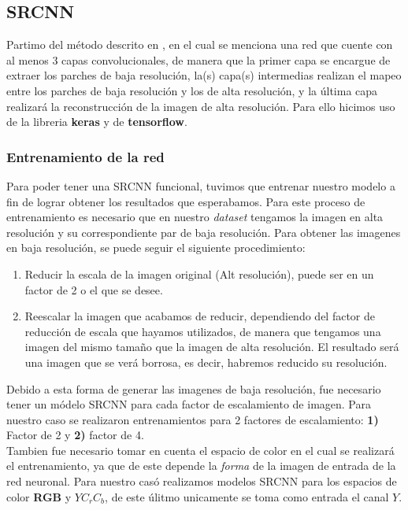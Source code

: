 \subsection{SRCNN}
Partimo del método descrito en \cite{SRCNN}, en el cual se menciona una red que cuente con al menos 3 capas convolucionales, de
manera que la primer capa se encargue de extraer los parches de baja resolución, la(s) capa(s) intermedias realizan el mapeo entre
los parches de baja resolución y los de alta resolución, y la última capa realizará la reconstrucción de la imagen de alta
resolución. Para ello hicimos uso de la libreria \textbf{keras} y de \textbf{tensorflow}.\\
\subsubsection{Entrenamiento de la red}
Para poder tener una SRCNN funcional, tuvimos que entrenar nuestro modelo a fin de lograr obtener los resultados que esperabamos.
Para este proceso de entrenamiento es necesario que en nuestro \emph{dataset} tengamos la imagen en alta resolución y su
correspondiente par de baja resolución. Para obtener las imagenes en baja resolución, se puede seguir el siguiente procedimiento:
\begin{enumerate}
    \item Reducir la escala de la imagen original (Alt resolución), puede ser en un factor de 2 o el que se desee.
    \item Reescalar la imagen que acabamos de reducir, dependiendo del factor de reducción de escala que hayamos utilizados, de
    manera que tengamos una imagen del mismo tamaño que la imagen de alta resolución. El resultado será una imagen que se verá
    borrosa, es decir, habremos reducido su resolución.
\end{enumerate}
Debido a esta forma de generar las imagenes de baja resolución, fue necesario tener un módelo SRCNN para cada factor de escalamiento
de imagen. Para nuestro caso se realizaron entrenamientos para 2 factores de escalamiento: \textbf{1)} Factor de 2 y \textbf{2)}
factor de 4.\\
Tambien fue necesario tomar en cuenta el espacio de color en el cual se realizará el entrenamiento, ya que de este depende la
\emph{forma} de la imagen de entrada de la red neuronal. Para nuestro casó realizamos modelos SRCNN para los espacios de color
\textbf{RGB} y \textbf{$YC_rC_b$}, de este úlitmo unicamente se toma como entrada el canal $Y$.\\

